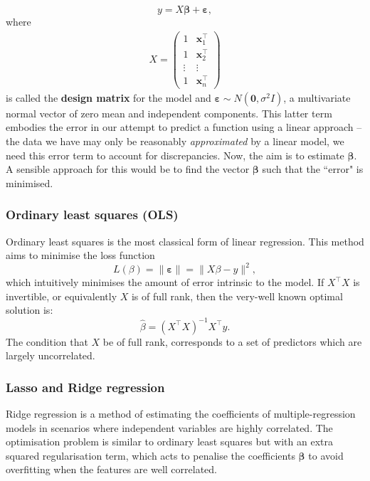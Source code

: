 \documentclass[twoside]{report}
\begin{document}
\begin{spacing}{1}
\[
y= X \boldsymbol{\beta}+\boldsymbol{\varepsilon},
\]
where
\[
\begin{aligned}
X=\left(\begin{array}{cc}
1 & \mathbf{x}_{1}^{\top} \\
1 & \mathbf{x}_{2}^{\top} \\
\vdots & \vdots \\
1 & \mathbf{x}_{n}^{\top}
\end{array}\right)
\end{aligned}
\]
is called the \textbf{design matrix} for the model and $\boldsymbol{\varepsilon} \sim N(\mathbf{0}, \sigma^2 I)$, a multivariate normal vector of zero mean and independent components. This latter term embodies the error in our attempt to predict a function using a linear approach -- the data we have may only be reasonably \textit{approximated} by a linear model, we need this error term to account for discrepancies.
Now, the aim is to estimate $\boldsymbol{\beta}$. A sensible approach for this would be to find the vector $\boldsymbol{\beta}$ such that the ``error" is minimised.

\subsubsection{Ordinary least squares (OLS)}
Ordinary least squares is the most classical form of linear regression. This method aims to minimise the loss function
\[
L({\beta})= \|\boldsymbol{\varepsilon}\|=\|X {\beta}-y\|^{2},
\]
which intuitively minimises the amount of error intrinsic to the model. If  $X^{\top} X$ is invertible, or equivalently $X$ is of full rank, then the very-well known optimal solution is:
\[
{\hat{\beta}}=\left(X^{\top} X\right)^{-1} X^{\top} y.
\]
The condition that $X$ be of full rank, corresponds to a set of predictors which are largely uncorrelated. 

\subsubsection{Lasso and Ridge regression}

Ridge regression is a method of estimating the coefficients of multiple-regression models in scenarios where independent variables are highly correlated. The optimisation problem is similar to ordinary least squares but with an extra squared regularisation term, which acts to penalise the coefficients $\boldsymbol{\beta}$ to avoid overfitting when the features are well correlated. 


\end{spacing}
\end{document}
